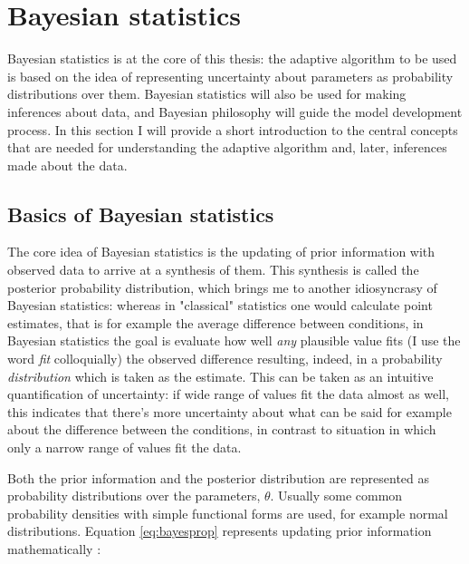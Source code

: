 \documentclass{article}\usepackage{knitr}
\begin{document}
 





\newpage


\section{Bayesian statistics}
\label{sec:bayes}

Bayesian statistics is at the core of this thesis: the adaptive algorithm to be used is based on the idea of representing uncertainty about parameters as probability distributions over them. Bayesian statistics will also be used for making inferences about data, and Bayesian philosophy will guide the model development process. In this section I will provide a short introduction to the central concepts that are needed for understanding the adaptive algorithm and, later, inferences made about the data. 

\subsection{Basics of Bayesian statistics}

The core idea of Bayesian statistics is the updating of prior information with observed data to arrive at a synthesis of them. This synthesis is called the posterior probability distribution, which brings me to another idiosyncrasy of Bayesian statistics: whereas in "classical" statistics one would calculate point estimates, that is for example the average difference between conditions, in Bayesian statistics the goal is evaluate how well \textit{any} plausible value fits (I use the word \textit{fit} colloquially) the observed difference resulting, indeed,  in a probability \textit{distribution} which is taken as the estimate. This can be taken as an intuitive quantification of uncertainty: if wide range of values fit the data almost as well, this indicates that there's more uncertainty about what can be said for example about the difference between the conditions, in contrast to situation in which only a narrow range of values fit the data.

Both the prior information and the posterior distribution are represented as probability distributions over the parameters, $\theta$. Usually some common probability densities with simple functional forms are used, for example normal distributions. Equation \ref{eq:bayesprop} represents updating prior information mathematically \citep{kruschke2015}:
\end{document}
